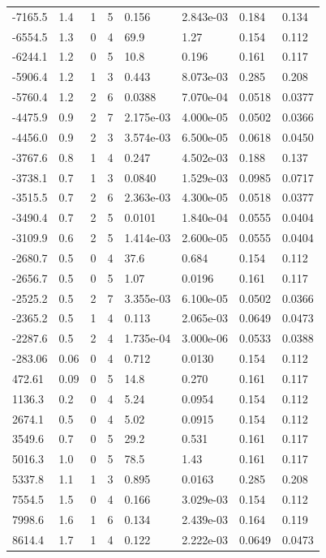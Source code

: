\documentclass[preview]{standalone}
\begin{document}
{{\begin{tabular}{L{1.2cm}C{1.2cm} C{0.3cm}C{0.5cm} C{1.4cm}C{1.4cm} C{1.4cm}C{1.4cm}}
  -7165.5  &   1.4  & 1     &  5 &  0.156  & 2.843e-03  & 0.184 &  0.134   \\ 
  -6554.5  &   1.3  & 0     &  4 &  69.9  & 1.27  & 0.154 &  0.112   \\ 
  -6244.1  &   1.2  & 0     &  5 &  10.8  & 0.196  & 0.161 &  0.117   \\ 
  -5906.4  &   1.2  & 1     &  3 &  0.443  & 8.073e-03  & 0.285 &  0.208   \\ 
  -5760.4  &   1.2  & 2     &  6 &  0.0388  & 7.070e-04  & 0.0518 &  0.0377   \\ 
  -4475.9  &   0.9  & 2     &  7 &  2.175e-03  & 4.000e-05  & 0.0502 &  0.0366   \\ 
  -4456.0  &   0.9  & 2     &  3 &  3.574e-03  & 6.500e-05  & 0.0618 &  0.0450   \\ 
  -3767.6  &   0.8  & 1     &  4 &  0.247  & 4.502e-03  & 0.188 &  0.137   \\ 
  -3738.1  &   0.7  & 1     &  3 &  0.0840  & 1.529e-03  & 0.0985 &  0.0717   \\ 
  -3515.5  &   0.7  & 2     &  6 &  2.363e-03  & 4.300e-05  & 0.0518 &  0.0377   \\ 
  -3490.4  &   0.7  & 2     &  5 &  0.0101  & 1.840e-04  & 0.0555 &  0.0404   \\ 
  -3109.9  &   0.6  & 2     &  5 &  1.414e-03  & 2.600e-05  & 0.0555 &  0.0404   \\ 
  -2680.7  &   0.5  & 0     &  4 &  37.6  & 0.684  & 0.154 &  0.112   \\ 
  -2656.7  &   0.5  & 0     &  5 &  1.07  & 0.0196  & 0.161 &  0.117   \\ 
  -2525.2  &   0.5  & 2     &  7 &  3.355e-03  & 6.100e-05  & 0.0502 &  0.0366   \\ 
  -2365.2  &   0.5  & 1     &  4 &  0.113  & 2.065e-03  & 0.0649 &  0.0473   \\ 
  -2287.6  &   0.5  & 2     &  4 &  1.735e-04  & 3.000e-06  & 0.0533 &  0.0388   \\ 
  -283.06  &  0.06  & 0     &  4 &  0.712  & 0.0130  & 0.154 &  0.112   \\ 
  472.61  &  0.09  & 0     &  5 &  14.8  & 0.270  & 0.161 &  0.117   \\ 
  1136.3  &   0.2  & 0     &  4 &  5.24  & 0.0954  & 0.154 &  0.112   \\ 
  2674.1  &   0.5  & 0     &  4 &  5.02  & 0.0915  & 0.154 &  0.112   \\ 
  3549.6  &   0.7  & 0     &  5 &  29.2  & 0.531  & 0.161 &  0.117   \\ 
  5016.3  &   1.0  & 0     &  5 &  78.5  & 1.43  & 0.161 &  0.117   \\ 
  5337.8  &   1.1  & 1     &  3 &  0.895  & 0.0163  & 0.285 &  0.208   \\ 
  7554.5  &   1.5  & 0     &  4 &  0.166  & 3.029e-03  & 0.154 &  0.112   \\ 
  7998.6  &   1.6  & 1     &  6 &  0.134  & 2.439e-03  & 0.164 &  0.119   \\ 
  8614.4  &   1.7  & 1     &  4 &  0.122  & 2.222e-03  & 0.0649 &  0.0473   \\ 
\hline 
\end{tabular} 

}}
\end{document}
